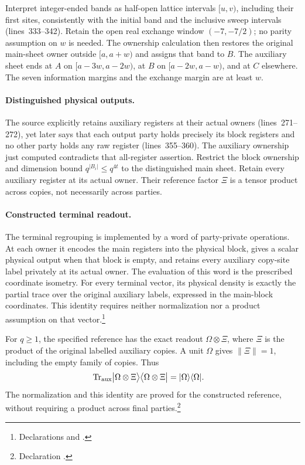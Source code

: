 \documentclass[10pt]{article}
\begin{document}
Interpret integer-ended bands as half-open lattice intervals $[u,v)$,
including their first sites, consistently with the initial band and the
inclusive sweep intervals (lines~333--342). Retain the open real exchange
window $(-7,-7/2)$; no parity assumption on $w$ is needed. The ownership
calculation then restores the original main-sheet owner outside
$[a,a+w)$ and assigns that band to $B$. The auxiliary sheet ends at $A$
on $[a-3w,a-2w)$, at $B$ on $[a-2w,a-w)$, and at $C$ elsewhere.
The seven information margins and the exchange margin are at least $w$.

\paragraph{Distinguished physical outputs.}
The source explicitly retains auxiliary registers at their actual owners
(lines~271--272), yet later says that each output party holds precisely
its block registers and no other party holds any raw register
(lines~355--360). The auxiliary ownership just computed contradicts that
all-register assertion. Restrict the block ownership and dimension bound
$q^{|B_i|}\le q^{4t}$ to the distinguished main sheet. Retain every
auxiliary register at its actual owner. Their reference factor $\Xi$ is a
tensor product across copies, not necessarily across parties.

\paragraph{Constructed terminal readout.}
The terminal regrouping is implemented by a word of party-private operations.
At each owner it encodes the main registers into the physical block, gives
a scalar physical output when that block is empty, and retains every
auxiliary copy-site label privately at its actual owner. The evaluation of
this word is the prescribed coordinate isometry. For every terminal vector,
its physical density is exactly the partial trace over the original
auxiliary labels, expressed in the main-block coordinates. This identity
requires neither normalization nor a product assumption on that vector.\footnote{
    Declarations 
    and .}

For $q\ge1$, the specified reference has the exact readout
$\Omega\otimes\Xi$, where
$\Xi$ is the product of the original labelled auxiliary copies. A unit
$\Omega$ gives $\|\Xi\|=1$, including the empty family of copies. Thus
\begin{align}
    \operatorname{Tr}_{\rm aux}
    \bigl|\Omega\otimes\Xi\bigr\rangle
    \bigl\langle\Omega\otimes\Xi\bigr|
     & =|\Omega\rangle\langle\Omega|.
    \label{eq:tnlean_one_dimensional_band_sweep_corrections_reference_partial_trace}
\end{align}
The normalization and this identity are proved for the constructed reference,
without requiring a product across final parties.\footnote{Declaration
    .}
\end{document}
